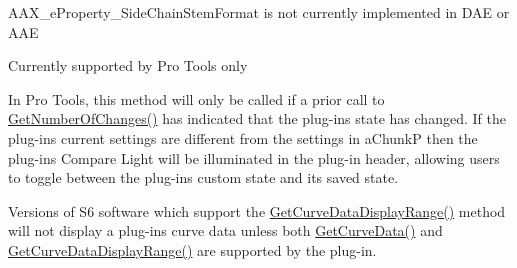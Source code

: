 \begin{DoxyRefList}
\label{a00786__compatibility_notes000067}%
%
 A\+A\+X\+\_\+e\+Property\+\_\+\+Side\+Chain\+Stem\+Format is not currently implemented in D\+AE or A\+AE  
\item[Member \mbox{\hyperlink{a00662_a13e384f22825afd3db6d68395b79ce0daf48412738dcfcc56046718d9e5a034d7}{A\+A\+X\+\_\+e\+Property\+\_\+\+Uses\+Client\+G\+UI}} ]\label{a00786__compatibility_notes000070}%
%
 Currently supported by Pro Tools only 
\item[Member \mbox{\hyperlink{a01669_a1e86f849e970c9998313fc7d451ccf85}{A\+A\+X\+\_\+\+I\+A\+C\+F\+Effect\+Parameters::Compare\+Active\+Chunk}} (const \mbox{\hyperlink{a01421}{A\+A\+X\+\_\+\+S\+Plug\+In\+Chunk}} $\ast$i\+ChunkP, A\+A\+X\+\_\+\+C\+Boolean $\ast$o\+Is\+Equal) const =0]\label{a00786__compatibility_notes000052}%
%
 In Pro Tools, this method will only be called if a prior call to \mbox{\hyperlink{a01669_a17b96da201d9a242d3662e87525a7227}{Get\+Number\+Of\+Changes()}} has indicated that the plug-\/in\textquotesingle{}s state has changed. If the plug-\/in\textquotesingle{}s current settings are different from the settings in {\ttfamily a\+ChunkP} then the plug-\/in\textquotesingle{}s Compare Light will be illuminated in the plug-\/in header, allowing users to toggle between the plug-\/in\textquotesingle{}s custom state and its saved state. 
\item[Member \mbox{\hyperlink{a00812_gaa85bda4027342eb644a9c92a17da6d49}{A\+A\+X\+\_\+\+I\+A\+C\+F\+Effect\+Parameters::Get\+Curve\+Data}} (A\+A\+X\+\_\+\+C\+Type\+ID i\+Curve\+Type, const float $\ast$i\+Values, uint32\+\_\+t i\+Num\+Values, float $\ast$o\+Values) const =0]\label{a00786__compatibility_notes000053}%
%
 Versions of S6 software which support the \mbox{\hyperlink{a00812_ga38d1ac0c15a7052904077ef0e2527e0d}{Get\+Curve\+Data\+Display\+Range()}} method will not display a plug-\/in\textquotesingle{}s curve data unless both \mbox{\hyperlink{a00812_gaa85bda4027342eb644a9c92a17da6d49}{Get\+Curve\+Data()}} and \mbox{\hyperlink{a00812_ga38d1ac0c15a7052904077ef0e2527e0d}{Get\+Curve\+Data\+Display\+Range()}} are supported by the plug-\/in. 
\item[Member \mbox{\hyperlink{a01669_a5d556ae1fa4617a6439ef347139d70eb}{A\+A\+X\+\_\+\+I\+A\+C\+F\+Effect\+Parameters::Get\+Parameter\+Name\+Of\+Length}} (A\+A\+X\+\_\+\+C\+Param\+ID i\+Parameter\+ID, \mbox{\hyperlink{a01873}{A\+A\+X\+\_\+\+I\+String}} $\ast$o\+Name, int32\+\_\+t i\+Name\+Length) const =0]\label{a00786__compatibility_notes000051}%

\end{DoxyRefList}
